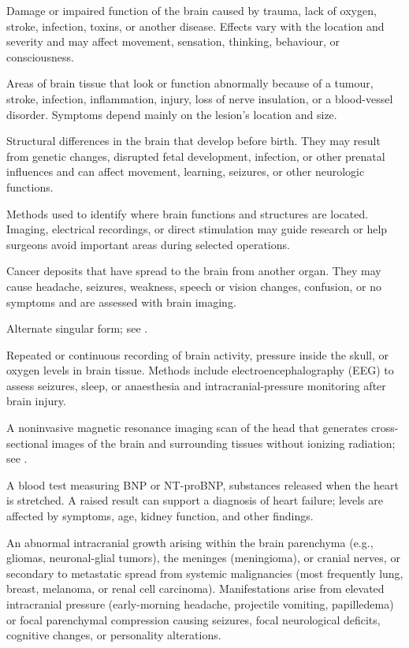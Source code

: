  Damage or impaired function of the brain caused by trauma, lack of oxygen, stroke, infection, toxins, or another disease. Effects vary with the location and severity and may affect movement, sensation, thinking, behaviour, or consciousness.

 Areas of brain tissue that look or function abnormally because of a tumour, stroke, infection, inflammation, injury, loss of nerve insulation, or a blood-vessel disorder. Symptoms depend mainly on the lesion's location and size.

 Structural differences in the brain that develop before birth. They may result from genetic changes, disrupted fetal development, infection, or other prenatal influences and can affect movement, learning, seizures, or other neurologic functions.

 Methods used to identify where brain functions and structures are located. Imaging, electrical recordings, or direct stimulation may guide research or help surgeons avoid important areas during selected operations.

 Cancer deposits that have spread to the brain from another organ. They may cause headache, seizures, weakness, speech or vision changes, confusion, or no symptoms and are assessed with brain imaging.

 Alternate singular form; see .

 Repeated or continuous recording of brain activity, pressure inside the skull, or oxygen levels in brain tissue. Methods include electroencephalography (EEG) to assess seizures, sleep, or anaesthesia and intracranial-pressure monitoring after brain injury.

 A noninvasive magnetic resonance imaging scan of the head that generates cross-sectional images of the brain and surrounding tissues without ionizing radiation; see .

 A blood test measuring BNP or NT-proBNP, substances released when the heart is stretched. A raised result can support a diagnosis of heart failure; levels are affected by symptoms, age, kidney function, and other findings.

 An abnormal intracranial growth arising within the brain parenchyma (e.g., gliomas, neuronal-glial tumors), the meninges (meningioma), or cranial nerves, or secondary to metastatic spread from systemic malignancies (most frequently lung, breast, melanoma, or renal cell carcinoma). Manifestations arise from elevated intracranial pressure (early-morning headache, projectile vomiting, papilledema) or focal parenchymal compression causing seizures, focal neurological deficits, cognitive changes, or personality alterations.


